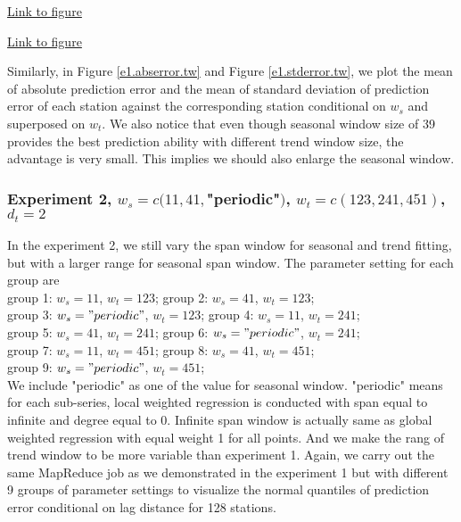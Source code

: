 \begin{framed}
\begin{center}
  \href{../plots/a1950/E1/tmax.mean.absmeans.error.tw.pdf}{Link to figure}
  \label{e1.abserror.tw}
\end{center}
\end{framed}

\begin{framed}
\begin{center}
  \href{../plots/a1950/E1/tmax.mean.std.error.tw.pdf}{Link to figure}
  \label{e1.stderror.tw}
\end{center}
\end{framed}

Similarly, in 
Figure \href{../plots/tmax.mean.absmeans.error.tw.pdf}{\ref*{e1.abserror.tw}}
and Figure \href{../plots/tmax.mean.std.error.tw.pdf}{\ref*{e1.stderror.tw}}, 
we plot the mean of absolute prediction error and the mean of standard deviation 
of prediction error of each station against the corresponding station conditional 
on $w_s$ and superposed on $w_t$. We also notice that even though seasonal window
size of 39 provides the best prediction ability with different trend window size,
the advantage is very small. This implies we should also enlarge the seasonal 
window.  

\subsubsection{Experiment 2,  
\textmd{$w_s=c(11, 41, $"periodic"$)$, $w_t=c(123, 241, 451)$, $d_t=2$}
}

In the experiment 2, we still vary the span window for seasonal and trend fitting,
but with a larger range for seasonal span window. The parameter setting for each 
group are
\\
group 1: $w_s = 11$, $w_t = 123$;
group 2: $w_s = 41$, $w_t = 123$;\\
group 3: $w_s = "periodic"$, $w_t = 123$;
group 4: $w_s = 11$, $w_t = 241$;\\
group 5: $w_s = 41$, $w_t = 241$;
group 6: $w_s = "periodic"$, $w_t = 241$;\\
group 7: $w_s = 11$, $w_t = 451$;
group 8: $w_s = 41$, $w_t = 451$;\\
group 9: $w_s = "periodic"$, $w_t = 451$;
\\
We include "periodic" as one 
of the value for seasonal window. "periodic" means for each sub-series, local 
weighted regression is conducted with span equal to infinite and degree equal to 
0. Infinite span window is actually same as global weighted regression with equal 
weight 1 for all points. And we make the rang of trend window to be more 
variable than experiment 1.
Again, we carry out the same MapReduce job as we demonstrated in the experiment
1 but with different 9 groups of parameter settings to visualize the normal 
quantiles of prediction error conditional on lag distance for 128 stations.

